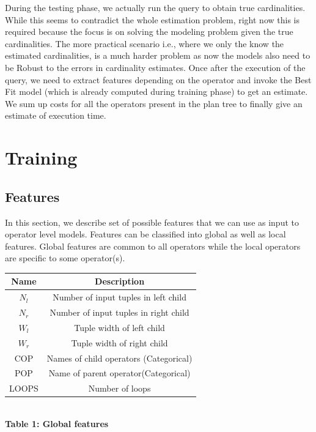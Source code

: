 \documentclass{article}
\begin{document}
\begin{multicols}{2}
\hfill
	
	During the testing phase, we actually run the query to obtain true cardinalities. While this
	seems to contradict the whole estimation problem, right now this is required because the focus is on
	solving the modeling problem given the true cardinalities. The more practical scenario i.e., where
	we only the know the estimated cardinalities, is a much harder problem as now the models also 
	need to be Robust to the errors in cardinality estimates. 
	Once after the execution of the query, we need to extract features depending on the operator and 
	invoke the Best Fit model (which is already computed during training phase) to get an estimate. We 
	sum up costs for all the operators present in the plan tree to finally give an estimate of execution 
	time. 	


	\section{Training}
	
	\subsection{Features}
	In this section, we describe set of possible features that we can use as input to operator level models. Features can be classified into global as well as local features. Global features are common to all operators while the local operators are specific to some operator(s). 

	\begin{center}
	\begin{tabular}{|c|c|} 
	\hline
	  Name & Description \\ \hline
	  $N_{l}$ & Number of input tuples in left child \\  \hline
	  $N_{r}$ & Number of input tuples in right child \\  \hline
	  $W_{l}$ & Tuple width of left child \\ \hline
	  $W_{r}$ & Tuple width of right child \\ \hline
	  COP & Names of child operators (Categorical) \\ \hline
	  POP & Name of parent operator(Categorical) \\ \hline
	  LOOPS & Number of loops \\ \hline
	\end{tabular}
	\\
	\vspace{.5cm}
	\textbf{Table 1: Global features}
	\end{center}
	

\end{multicols}
\end{document}
